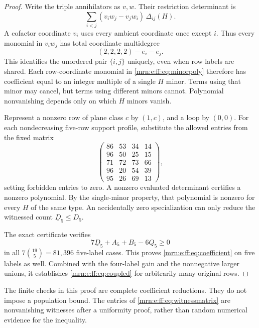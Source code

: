 \documentclass[11pt,a4paper]{article}
\theoremstyle{remark}\newtheorem{remark}[theorem]{Remark}
\begin{document}
\begin{proof}
Write the triple annihilators as $v,w$. Their restriction determinant is
\begin{equation}\label{mrn:e:ff:eq:minorpoly}
 \sum_{i<j}(v_iw_j-v_jw_i)\,\Delta_{ij}(H).
\end{equation}
A cofactor coordinate $v_i$ uses every ambient coordinate once except $i$. Thus every monomial in $v_iw_j$ has total coordinate multidegree
\[
 (2,2,2,2)-e_i-e_j.
\]
This identifies the unordered pair $\{i,j\}$ uniquely, even when row labels are shared. Each row-coordinate monomial in \eqref{mrn:e:ff:eq:minorpoly} therefore has coefficient equal to an integer multiple of a single $H$ minor. Terms using that minor may cancel, but terms using different minors cannot. Polynomial nonvanishing depends only on which $H$ minors vanish.

Represent a nonzero row of plane class $c$ by $(1,c)$, and a loop by $(0,0)$. For each nondecreasing five-row support profile, substitute the allowed entries from the fixed matrix
\begin{equation}\label{mrn:e:ff:eq:witnessmatrix}
 \begin{pmatrix}
 86&53&34&14\\96&50&25&15\\71&72&73&66\\96&20&54&39\\95&26&69&13
 \end{pmatrix},
\end{equation}
setting forbidden entries to zero. A nonzero evaluated determinant certifies a nonzero polynomial. By the single-minor property, that polynomial is nonzero for every $H$ of the same type. An accidentally zero specialization can only reduce the witnessed count $\underline D_5\le D_5$.

The exact certificate verifies
\[
 7\underline D_5+A_5+B_5-6Q_5\ge0
\]
in all $7\binom{19}{5}=81{,}396$ five-label cases. This proves \eqref{mrn:e:ff:eq:coefficient} on five labels as well. Combined with the four-label gain and the nonnegative larger unions, it establishes \eqref{mrn:e:ff:eq:coupled} for arbitrarily many original rows.
\end{proof}
The finite checks in this proof are complete coefficient reductions. They do not impose a population bound. The entries of \eqref{mrn:e:ff:eq:witnessmatrix} are nonvanishing witnesses after a uniformity proof, rather than random numerical evidence for the inequality.
\end{document}
